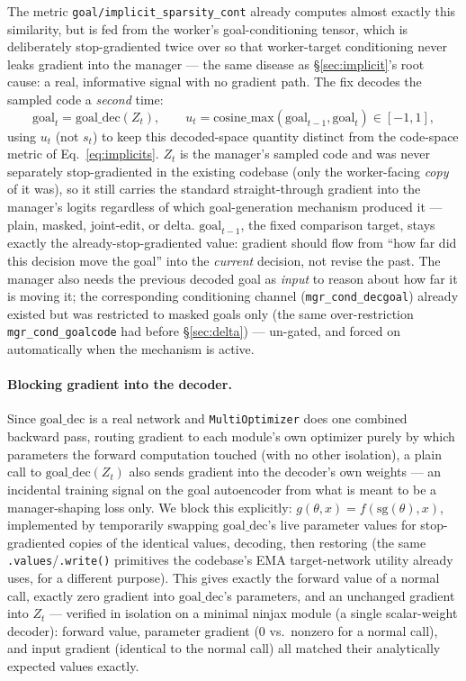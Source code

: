 \documentclass[10pt]{article}
\begin{document}
The metric \texttt{goal/implicit\_sparsity\_cont} already computes almost
exactly this similarity, but is fed from the worker's goal-conditioning
tensor, which is deliberately stop-gradiented twice over so that
worker-target conditioning never leaks gradient into the manager --- the same
disease as \S\ref{sec:implicit}'s root cause: a real, informative signal
with no gradient path. The fix decodes the sampled code a \emph{second} time:
\begin{equation}
  \text{goal}_t = \mathrm{goal\_dec}(Z_t), \qquad
  u_t = \mathrm{cosine\_max}(\text{goal}_{t-1}, \text{goal}_t) \in [-1, 1],
\label{eq:goalreuse}
\end{equation}
using $u_t$ (not $s_t$) to keep this decoded-space quantity distinct from the
code-space metric of Eq.~\eqref{eq:implicits}.
$Z_t$ is the manager's sampled code and was never separately stop-gradiented
in the existing codebase (only the worker-facing \emph{copy} of it was), so
it still carries the standard straight-through gradient into the manager's
logits regardless of which goal-generation mechanism produced it --- plain,
masked, joint-edit, or delta. $\text{goal}_{t-1}$, the fixed comparison
target, stays exactly the already-stop-gradiented value: gradient should
flow from ``how far did this decision move the goal'' into the
\emph{current} decision, not revise the past. The manager also needs the
previous decoded goal as \emph{input} to reason about how far it is moving
it; the corresponding conditioning channel (\texttt{mgr\_cond\_decgoal})
already existed but was restricted to masked goals only (the same
over-restriction \texttt{mgr\_cond\_goalcode} had before \S\ref{sec:delta})
--- un-gated, and forced on automatically when the mechanism is active.

\paragraph{Blocking gradient into the decoder.} Since $\mathrm{goal\_dec}$
is a real network and \texttt{MultiOptimizer} does one combined backward
pass, routing gradient to each module's own optimizer purely by which
parameters the forward computation touched (with no other isolation), a
plain call to $\mathrm{goal\_dec}(Z_t)$ also sends gradient into the
decoder's own weights --- an incidental training signal on the goal
autoencoder from what is meant to be a manager-shaping loss only. We block
this explicitly: $g(\theta, x) = f(\mathrm{sg}(\theta), x)$, implemented by
temporarily swapping $\mathrm{goal\_dec}$'s live parameter values for
stop-gradiented copies of the identical values, decoding, then restoring
(the same \texttt{.values}/\texttt{.write()} primitives the codebase's EMA
target-network utility already uses, for a different purpose). This gives
exactly the forward value of a normal call, exactly zero gradient into
$\mathrm{goal\_dec}$'s parameters, and an unchanged gradient into $Z_t$ ---
verified in isolation on a minimal ninjax module (a single scalar-weight
decoder): forward value, parameter gradient ($0$ vs.\ nonzero for a normal
call), and input gradient (identical to the normal call) all matched their
analytically expected values exactly.
\end{document}
